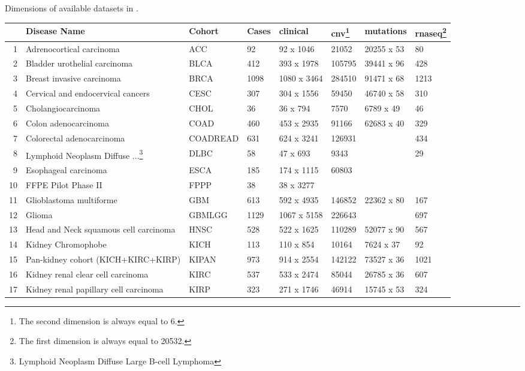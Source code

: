 \begin{widetable}[h]
\centering
\caption{\label{data_details}Dimensions of available datasets in .}
\begin{tabular}{rlllllll}
  \toprule
 & Disease Name & Cohort & Cases & clinical & cnv\footnote{The second dimension is always equal to 6.} & mutations & rnaseq\footnote{The first dimension is always equal to 20532.} \\ 
  \toprule
1 & Adrenocortical carcinoma & ACC & 92 & 92 x 1046 & 21052  & 20255 x 53 &   80 \\ 
  2 & Bladder urothelial carcinoma & BLCA & 412 & 393 x 1978 & 105795  & 39441 x 96 &   428 \\ 
  3 & Breast invasive carcinoma & BRCA & 1098 & 1080 x 3464 & 284510  & 91471 x 68 &   1213 \\ 
  4 & Cervical and endocervical cancers & CESC & 307 & 304 x 1556 & 59450  & 46740 x 58 &   310 \\ 
  5 & Cholangiocarcinoma & CHOL & 36 & 36 x 794 & 7570  & 6789 x 49 &   46 \\ 
  6 & Colon adenocarcinoma & COAD & 460 & 453 x 2935 & 91166  & 62683 x 40 &   329 \\ 
  7 & Colorectal adenocarcinoma & COADREAD & 631 & 624 x 3241 & 126931  &  &   434 \\ 
  8 & Lymphoid Neoplasm Diffuse ...\footnote{Lymphoid Neoplasm Diffuse Large B-cell Lymphoma} & DLBC & 58 & 47 x 693 & 9343  &  &   29 \\ 
  9 & Esophageal carcinoma & ESCA & 185 & 174 x 1115 & 60803  &  &  \\ 
  10 & FFPE Pilot Phase II & FPPP & 38 & 38 x 3277 &  &  &  \\ 
  11 & Glioblastoma multiforme & GBM & 613 & 592 x 4935 & 146852  & 22362 x 80 &   167 \\ 
  12 & Glioma & GBMLGG & 1129 & 1067 x 5158 & 226643  &  &   697 \\ 
  13 & Head and Neck squamous cell carcinoma & HNSC & 528 & 522 x 1625 & 110289  & 52077 x 90 &   567 \\ 
  14 & Kidney Chromophobe & KICH & 113 & 110 x 854 & 10164  & 7624 x 37 &   92 \\ 
  15 & Pan-kidney cohort (KICH+KIRC+KIRP) & KIPAN & 973 & 914 x 2554 & 142122  & 73527 x 36 &   1021 \\ 
  16 & Kidney renal clear cell carcinoma & KIRC & 537 & 533 x 2474 & 85044  & 26785 x 36 &   607 \\ 
  17 & Kidney renal papillary cell carcinoma & KIRP & 323 & 271 x 1746 & 46914  & 15745 x 53 &   324 \\ 

\end{tabular}
\end{widetable}
